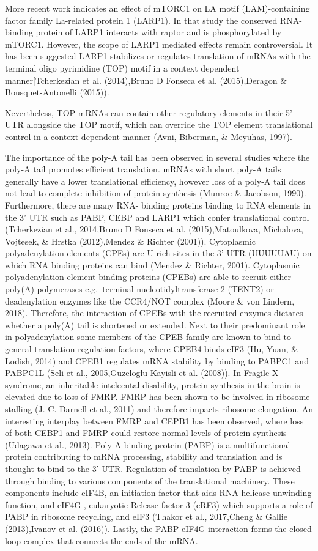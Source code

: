 \documentclass[12pt,openany]{book}
\begin{document}
More recent work indicates an effect of mTORC1 on LA motif
(LAM)-containing factor family La-related protein 1 (LARP1). In that
study the conserved RNA-binding protein of LARP1 interacts with raptor
and is phosphorylated by mTORC1. However, the scope of LARP1 mediated
effects remain controversial. It has been suggested LARP1 stabilizes or
regulates translation of mRNAs with the terminal oligo pyrimidine (TOP)
motif in a context dependent manner{[}Tcherkezian et al. (2014),Bruno D
Fonseca et al. (2015),Deragon \& Bousquet-Antonelli (2015)).

Nevertheless, TOP mRNAs can contain other regulatory elements in their
5' UTR alongside the TOP motif, which can override the TOP element
translational control in a context dependent manner (Avni, Biberman, \&
Meyuhas, 1997).

The importance of the poly-A tail has been observed in several studies
where the poly-A tail promotes efficient translation. mRNAs with short
poly-A tails generally have a lower translational efficiency, however
loss of a poly-A tail does not lead to complete inhibition of protein
synthesis (Munroe \& Jacobson, 1990). Furthermore, there are many RNA-
binding proteins binding to RNA elements in the 3' UTR such as PABP,
CEBP and LARP1 which confer translational control (Tcherkezian et al.,
2014,Bruno D Fonseca et al. (2015),Matoulkova, Michalova, Vojtesek, \&
Hrstka (2012),Mendez \& Richter (2001)). Cytoplasmic polyadenylation
elements (CPEs) are U-rich sites in the 3' UTR (UUUUUAU) on which RNA
binding proteins can bind (Mendez \& Richter, 2001). Cytoplasmic
polyadenylation element binding proteins (CPEBs) are able to recruit
either poly(A) polymerases e.g.~terminal nucleotidyltransferase 2
(TENT2) or deadenylation enzymes like the CCR4/NOT complex (Moore \& von
Lindern, 2018). Therefore, the interaction of CPEBs with the recruited
enzymes dictates whether a poly(A) tail is shortened or extended. Next
to their predominant role in polyadenylation some members of the CPEB
family are known to bind to general translation regulation factors,
where CPEB4 binds eIF3 (Hu, Yuan, \& Lodish, 2014) and CPEB1 regulates
mRNA stability by binding to PABPC1 and PABPC1L (Seli et al.,
2005,Guzeloglu-Kayisli et al. (2008)). In Fragile X syndrome, an
inheritable intelecutal disability, protein synthesis in the brain is
elevated due to loss of FMRP. FMRP has been shown to be involved in
ribosome stalling (J. C. Darnell et al., 2011) and therefore impacts
ribosome elongation. An interesting interplay between FMRP and CEPB1 has
been observed, where loss of both CEBP1 and FMRP could restore normal
levels of protein synthesis (Udagawa et al., 2013). Poly-A-binding
protein (PABP) is a multifunctional protein contributing to mRNA
processing, stability and translation and is thought to bind to the 3'
UTR. Regulation of translation by PABP is achieved through binding to
various components of the translational machinery. These components
include eIF4B, an initiation factor that aids RNA helicase unwinding
function, and eIF4G , eukaryotic Release factor 3 (eRF3) which supports
a role of PABP in ribosome recycling, and eIF3 (Thakor et al.,
2017,Cheng \& Gallie (2013),Ivanov et al. (2016)). Lastly, the
PABP-eIF4G interaction forms the closed loop complex that connects the
ends of the mRNA.
\end{document}
